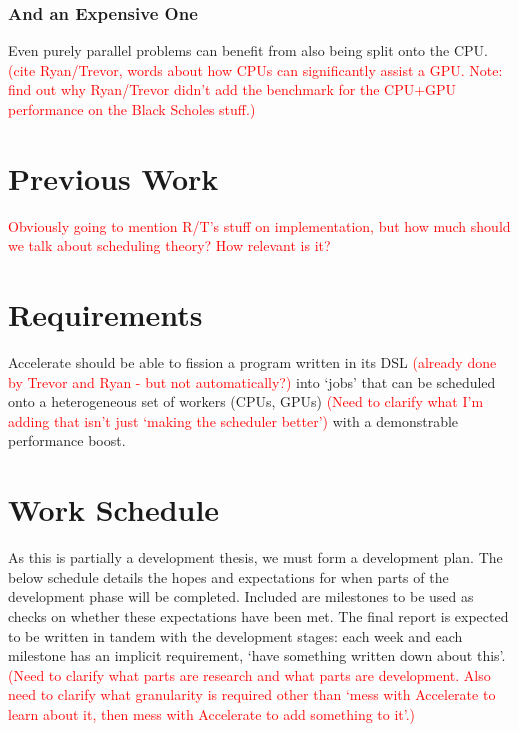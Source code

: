 \documentclass[a4paper,12pt]{article}
\newcommand{\red}[1]{\textcolor{red}{#1}}
\begin{document}
\subsubsection*{And an Expensive One}
Even purely parallel problems can benefit from also being split onto the CPU.
\red{(cite Ryan/Trevor, words about how CPUs can significantly assist a GPU. Note: find out why Ryan/Trevor didn't add the benchmark for the CPU+GPU performance on the Black Scholes stuff.)}


\section{Previous Work}

\red{Obviously going to mention R/T's stuff on implementation, but how much should we talk about scheduling theory? How relevant is it?}

\section{Requirements}

Accelerate should be able to fission a program written in its DSL \red{(already done by Trevor and Ryan - but not automatically?)} into `jobs' that can be scheduled onto a heterogeneous set of workers (CPUs, GPUs) \red{(Need to clarify what I'm adding that isn't just `making the scheduler better')} with a demonstrable performance boost.

\section{Work Schedule}

As this is partially a development thesis, we must form a development plan.
The below schedule details the hopes and expectations for when parts of the development phase will be completed.
Included are milestones to be used as checks on whether these expectations have been met.
The final report is expected to be written in tandem with the development stages: each week and each milestone has an implicit requirement, `have something written down about this'.
\red{(Need to clarify what parts are research and what parts are development. Also need to clarify what granularity is required other than `mess with Accelerate to learn about it, then mess with Accelerate to add something to it'.)}
\end{document}
